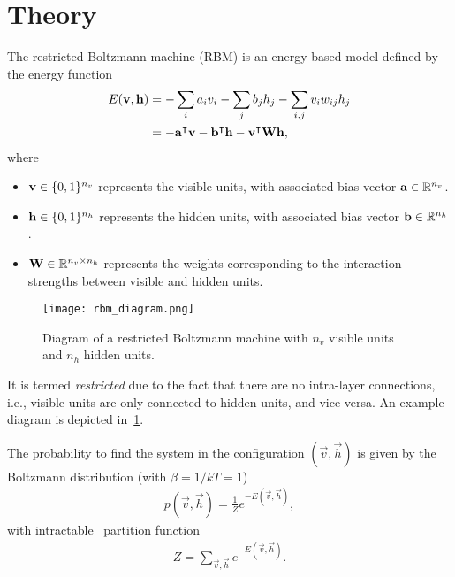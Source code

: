 \section{Theory}
The restricted Boltzmann machine (RBM) is an energy-based model defined by the energy function~\cite{goodfellow_deep_learning}
\begin{align}
\begin{split}
    \label{eq:rbm_energy}
    E(\mathbf{v}, \mathbf{h})
        &= -\sum_i a_i v_i - \sum_j b_j h_j - \sum_{i,j} v_i w_{ij} h_j \\
        &= -\mathbf{a}^\intercal\mathbf{v} - \mathbf{b}^\intercal\mathbf{h} - \mathbf{v}^\intercal\mathbf{W}\mathbf{h},
\end{split}
\end{align}
where
\begin{itemize}
    \item \( \mathbf{v} \in \{0,1\}^{n_v} \) represents the visible units, with associated bias vector \( \mathbf{a} \in \mathbb{R}^{n_v} \).
    \item \( \mathbf{h} \in \{0,1\}^{n_h} \) represents the hidden units, with associated bias vector \( \mathbf{b} \in \mathbb{R}^{n_h} \).
    \item \( \mathbf{W} \in \mathbb{R}^{n_v \times n_h} \) represents the weights corresponding to the interaction strengths between visible and hidden units.
\end{itemize}

\begin{figure}[!htb]
    \begin{center}
        \texttt{[image: rbm\_diagram.png]}
    \end{center}
    \caption{Diagram of a restricted Boltzmann machine with \( n_v \) visible units and \( n_h \) hidden units.}
    \label{fig:rbm_diagram}
\end{figure}

It is termed \textit{restricted} due to the fact that there are no intra-layer connections, i.e., visible units are only connected to hidden units, and vice versa.
An example diagram is depicted in~\cref{fig:rbm_diagram}.

The probability to find the system in the configuration \( (\vec{v},\vec{h}) \) is given by the Boltzmann distribution (with \( \beta = 1/kT = 1 \))
\begin{align}
    \label{eq:rbm_joint_probability}
    p(\vec{v}, \vec{h}) = \frac{1}{Z} e^{-E(\vec{v},\vec{h})},
\end{align}
with intractable~\cite{long_servedio_2010} partition function
\begin{align}
    \label{eq:rbm_partition_function}
    Z = \sum_{\vec{v},\vec{h}} e^{-E(\vec{v},\vec{h})}.
\end{align}


